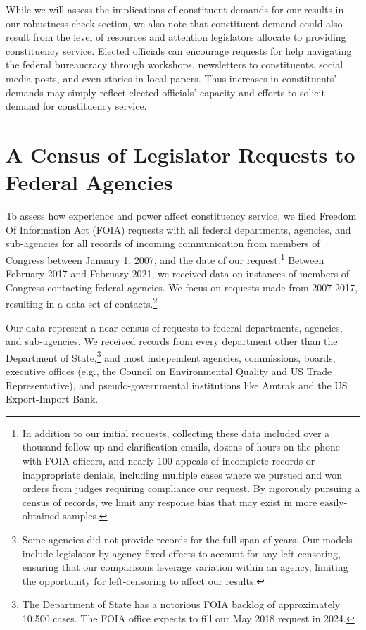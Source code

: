 \documentclass[12pt]{article}
\begin{document}
While we will assess the implications of constituent demands for our results in our robustness check section, we also note that constituent demand could also result from the level of resources and attention legislators allocate to providing constituency service. Elected officials can encourage requests for help navigating the federal bureaucracy through workshops, newsletters to constituents, social media posts, and even stories in local papers. Thus increases in constituents' demands may simply reflect elected officials' capacity and efforts to solicit demand for constituency service.

\section{A Census of Legislator Requests to Federal Agencies} \label{s:data}
To assess how experience and power affect constituency service, we filed   Freedom Of Information Act (FOIA) requests with all federal departments, agencies, and sub-agencies for all records of incoming communication from members of Congress between January 1, 2007, and the date of our request.\footnote{In addition to our initial requests, collecting these data included over a thousand follow-up and clarification emails, dozens of hours on the phone with FOIA officers, and nearly 100 appeals of incomplete records or inappropriate denials, including multiple cases where we pursued and won orders from judges requiring compliance our request. By rigorously pursuing a census of records, we limit any response bias that may exist in more easily-obtained samples.} Between February 2017 and February 2021, we received data on  instances of members of Congress contacting federal agencies. We focus on requests made from 2007-2017, resulting in a data set of   contacts.\footnote{Some agencies did not provide records for the full span of years. Our models include legislator-by-agency fixed effects to account for any left censoring, ensuring that our comparisons leverage variation within an agency, limiting the opportunity for left-censoring to affect our results.}  %

Our data represent a near census of requests to federal departments, agencies, and sub-agencies. We received records from every department other than the Department of State,\footnote{The Department of State has a notorious FOIA backlog of approximately 10,500 cases. The FOIA office expects to fill our May 2018 request in 2024.} and most independent agencies, commissions, boards, executive offices (e.g., the Council on Environmental Quality and US Trade Representative), and pseudo-governmental institutions like Amtrak and the US Export-Import Bank. 
\end{document}
